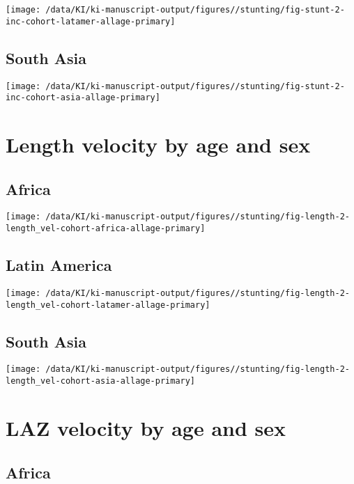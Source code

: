 \documentclass[
  9pt,
]{book}
\begin{document}
\texttt{[image: /data/KI/ki-manuscript-output/figures//stunting/fig-stunt-2-inc-cohort-latamer-allage-primary]}

\hypertarget{south-asia-2}{%
\subsection{South Asia}\label{south-asia-2}}

\texttt{[image: /data/KI/ki-manuscript-output/figures//stunting/fig-stunt-2-inc-cohort-asia-allage-primary]}

\hypertarget{length-velocity-by-age-and-sex}{%
\section{Length velocity by age and sex}\label{length-velocity-by-age-and-sex}}

\hypertarget{africa-3}{%
\subsection{Africa}\label{africa-3}}

\texttt{[image: /data/KI/ki-manuscript-output/figures//stunting/fig-length-2-length\_vel-cohort-africa-allage-primary]}

\hypertarget{latin-america-3}{%
\subsection{Latin America}\label{latin-america-3}}

\texttt{[image: /data/KI/ki-manuscript-output/figures//stunting/fig-length-2-length\_vel-cohort-latamer-allage-primary]}

\hypertarget{south-asia-3}{%
\subsection{South Asia}\label{south-asia-3}}

\texttt{[image: /data/KI/ki-manuscript-output/figures//stunting/fig-length-2-length\_vel-cohort-asia-allage-primary]}

\hypertarget{laz-velocity-by-age-and-sex}{%
\section{LAZ velocity by age and sex}\label{laz-velocity-by-age-and-sex}}

\hypertarget{africa-4}{%
\subsection{Africa}\label{africa-4}}
\end{document}
